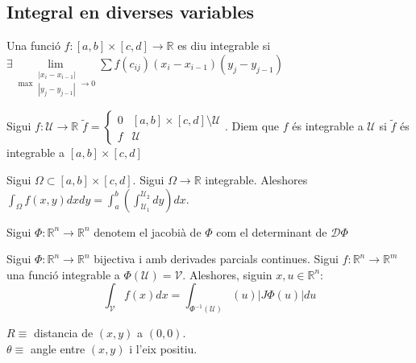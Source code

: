 \documentclass[../main.tex]{subfiles}
\begin{document}
    \subsection{Integral en diverses variables}
    \begin{definicio}
        Una funció $f: [a,b]\times[c,d] \to \mathbb{R}$ es diu integrable si\\$\exists \lim\limits_{\max{\substack{\left\lvert x_i-x_{i-1}\right\rvert\\\left\lvert y_j-y_{j-1}\right\rvert}} \to 0} \sum f\left(c_{ij}\right)(x_i-x_{i-1})(y_j-y_{j-1})$
    \end{definicio}
    \begin{definicio}
        Sigui $f: \mathcal{U} \to \mathbb{R}$ $\tilde{f} = \begin{cases}
            0 & [a,b] \times [c,d]\setminus \mathcal{U}\\
            f & \mathcal{U}
        \end{cases}$.
        Diem que $f$ és integrable a $\mathcal{U}$ si $\tilde{f}$ és integrable a $[a, b] \times [c, d]$
    \end{definicio}
    \begin{teorema}[Fubini]
        Sigui $\Omega \subset [a, b] \times [c, d]$. Sigui $\Omega \to \mathbb{R}$ integrable.
        Aleshores $\int_\Omega f\left(x,y\right) dx dy = \int_a^b\left(\int_{\mathcal{U}_1}^{\mathcal{U}_2} dy\right) dx$.
    \end{teorema}
    \begin{definicio}
        Sigui $\Phi: \mathbb{R}^n \to \mathbb{R}^n$ denotem el jacobià de $\Phi$ com el determinant
        de $\mathcal{D}\Phi$
    \end{definicio}
    \begin{teorema}
        Sigui $\Phi: \mathbb{R}^n \to \mathbb{R}^n$ bijectiva i amb derivades parcials continues.
        Sigui $f: \mathbb{R}^n \to \mathbb{R}^m$ una funció integrable a $\Phi\left(\mathcal{U}\right) = \mathcal{V}$.
        Aleshores, siguin $x, u \in \mathbb{R}^n$:
        \begin{displaymath}
            \int_\mathcal{V} f(x) dx = \int_{\Phi^{-1}\left(\mathcal{U}\right)}\left(u\right)\left\lvert J\Phi\left(u\right)\right\rvert du
        \end{displaymath}
    \end{teorema}
    \begin{definicio}
        $\;$\\
        $R \equiv$ distancia de $(x,y)$ a $(0,0)$.\\
        $\theta \equiv$ angle entre $(x,y)$ i l'eix positiu.
    \end{definicio}
\end{document}
